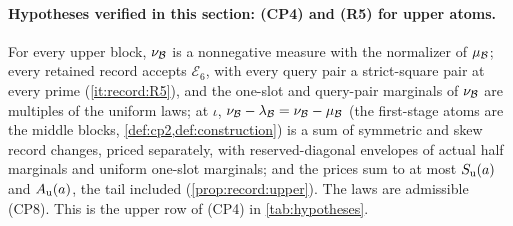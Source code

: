 \paragraph{Hypotheses verified in this section: (CP4) and (R5) for upper atoms.}
For every upper block, $\nu_\mathcal B$ is a nonnegative measure with the normalizer
of $\mu_\mathcal B$; every retained record accepts $\mathcal E_6$, with every query
pair a strict-square pair at every prime (\ref{it:record:R5}), and the one-slot
and query-pair marginals of $\nu_\mathcal B$ are multiples of the uniform laws; at
$\iota$, $\nu_\mathcal B-\lambda_\mathcal B=\nu_\mathcal B-\mu_\mathcal B$ (the first-stage atoms are the
middle blocks, \cref{def:cp2,def:construction}) is a sum of symmetric and skew record
changes, priced separately, with reserved-diagonal envelopes of actual half
marginals and uniform one-slot marginals; and the prices sum to at most
$S_{\rm u}(a)$ and $A_{\rm u}(a)$, the tail included (\cref{prop:record:upper}). The
laws are admissible (CP8). This is the upper row of (CP4) in \cref{tab:hypotheses}.
